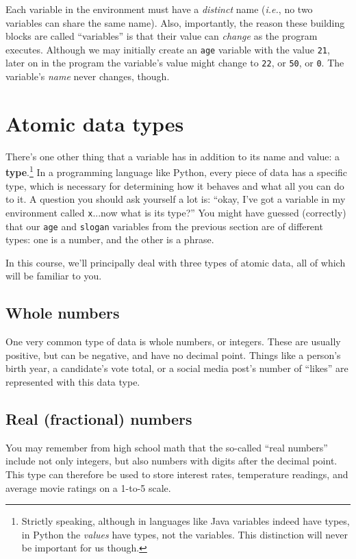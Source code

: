 Each variable in the environment must have a \textit{distinct} name
(\textit{i.e.}, no two variables can share the same name). Also, importantly,
the reason these building blocks are called ``variables'' is that their value
can \textit{change} as the program executes. Although we may initially create
an \texttt{age} variable with the value \texttt{21}, later on in the program
the variable's value might change to \texttt{22}, or \texttt{50}, or
\texttt{0}. The variable's \textit{name} never changes, though.

\section{Atomic data types}

There's one other thing that a variable has in addition to its name and value:
a \textbf{type}.\footnote{Strictly speaking, although in languages like Java
variables indeed have types, in Python the \textit{values} have types, not the
variables. This distinction will never be important for us though.}  In a
programming language like Python, every piece of data has a specific type,
which is necessary for determining how it behaves and what all you can do to
it. A question you should ask yourself a lot is: ``okay, I've got a variable in
my environment called \texttt{x}...now what is its type?'' You might have
guessed (correctly) that our \texttt{age} and \texttt{slogan} variables from
the previous section are of different types: one is a number, and the other is
a phrase.

In this course, we'll principally deal with three types of atomic data, all of
which will be familiar to you.


\subsection{Whole numbers}

One very common type of data is whole numbers, or integers. These are usually
positive, but can be negative, and have no decimal point. Things like a
person's birth year, a candidate's vote total, or a social media post's number
of ``likes'' are represented with this data type.


\subsection{Real (fractional) numbers}

You may remember from high school math that the so-called ``real numbers''
include not only integers, but also numbers with digits after the decimal
point. This type can therefore be used to store interest rates, temperature
readings, and average movie ratings on a 1-to-5 scale.

